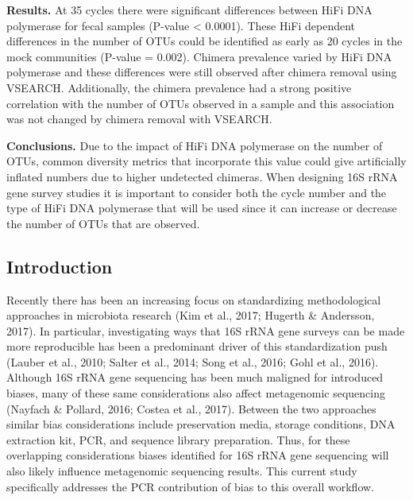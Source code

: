 \documentclass[12pt,]{article}
\begin{document}
\textbf{Results.} At 35 cycles there were significant differences
between HiFi DNA polymerase for fecal samples (P-value \textless{}
0.0001). These HiFi dependent differences in the number of OTUs could be
identified as early as 20 cycles in the mock communities (P-value =
0.002). Chimera prevalence varied by HiFi DNA polymerase and these
differences were still observed after chimera removal using VSEARCH.
Additionally, the chimera prevalence had a strong positive correlation
with the number of OTUs observed in a sample and this association was
not changed by chimera removal with VSEARCH.

\textbf{Conclusions.} Due to the impact of HiFi DNA polymerase on the
number of OTUs, common diversity metrics that incorporate this value
could give artificially inflated numbers due to higher undetected
chimeras. When designing 16S rRNA gene survey studies it is important to
consider both the cycle number and the type of HiFi DNA polymerase that
will be used since it can increase or decrease the number of OTUs that
are observed.

\newpage

\subsection{Introduction}\label{introduction}

Recently there has been an increasing focus on standardizing
methodological approaches in microbiota research (Kim et al., 2017;
Hugerth \& Andersson, 2017). In particular, investigating ways that 16S
rRNA gene surveys can be made more reproducible has been a predominant
driver of this standardization push (Lauber et al., 2010; Salter et al.,
2014; Song et al., 2016; Gohl et al., 2016). Although 16S rRNA gene
sequencing has been much maligned for introduced biases, many of these
same considerations also affect metagenomic sequencing (Nayfach \&
Pollard, 2016; Costea et al., 2017). Between the two approaches similar
bias considerations include preservation media, storage conditions, DNA
extraction kit, PCR, and sequence library preparation. Thus, for these
overlapping considerations biases identified for 16S rRNA gene
sequencing will also likely influence metagenomic sequencing results.
This current study specifically addresses the PCR contribution of bias
to this overall workflow.
\end{document}
